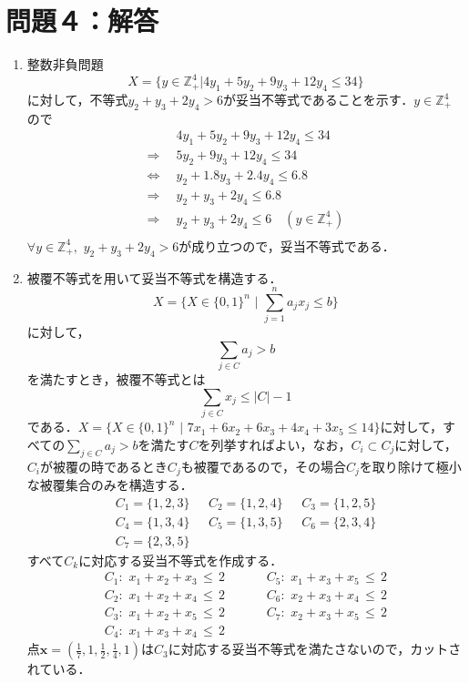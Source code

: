 \documentclass[a4paper,11pt]{jsarticle}
\numberwithin{theorem}{section}  %
\numberwithin{equation}{section} %
\begin{document}
\newpage
\section{問題４：解答}
\begin{enumerate}
\item
整数非負問題
\[
X=\{ y \in \mathbb{Z}_+^4 | 4y_1 + 5y_2 + 9y_3 + 12y_4 \le 34 \}
\]
に対して，不等式$y_2+y_3+2y_4 > 6$が妥当不等式であることを示す．$y \in \mathbb{Z}_+^4$ので
\[
\begin{split}
& \,\,\,4y_1 + 5y_2 + 9y_3 + 12y_4 \le 34 \\
\Rightarrow &\,\,\, 5y_2+9y_3 + 12y_4 \le 34\\
\Leftrightarrow &\,\,\, y_2 + 1.8y_3 + 2.4y_4 \le 6.8 \\
\Rightarrow &\,\,\, y_2 + y_3 + 2y_4 \le 6.8 \\
\Rightarrow &\,\,\, y_2 + y_3 + 2y_4 \le 6 \,\,\,\,\,\,(y\in \mathbb{Z}_+^4)\\
\end{split}
\]
$\forall y\in \mathbb{Z}_+^4,\,\, y_2+y_3+2y_4 > 6$が成り立つので，妥当不等式である．
\item
被覆不等式を用いて妥当不等式を構造する．\\
\[
X = \{ X \in \{0,1\}^n\,\,|\,\, \sum_{j=1}^n a_jx_j \le b \}
\]
に対して，
\[
\sum_{j \in C} a_j > b
\]
を満たすとき，被覆不等式とは
\[
\sum_{j\in C} x_j \le |C| -1
\]
である．$X = \{ X \in \{0,1\}^n\,\,|\,\, 7x_1 + 6x_2 + 6x_3 + 4x_4 + 3x_5 \le 14 \}$に対して，すべての$\sum_{j \in C} a_j > b$を満たす$C$を列挙すればよい，なお，$C_i \subset C_j$に対して，$C_i$が被覆の時であるとき$C_j$も被覆であるので，その場合$C_j$を取り除けて極小な被覆集合のみを構造する．
\begin{eqnarray*}
C_1 = \{ 1, 2, 3 \} \,\,&\,\, C_2 = \{ 1, 2, 4 \} \,\,&\,\, C_3 = \{ 1, 2, 5 \}  \\
C_4 = \{ 1, 3, 4 \} \,\,&\,\, C_5 = \{ 1, 3, 5 \} \,\,&\,\, C_6 = \{ 2, 3, 4 \}  \\
C_7 = \{ 2, 3, 5 \} \,\,&\,\, 
\end{eqnarray*}
すべて$C_k$に対応する妥当不等式を作成する．
\begin{eqnarray*}
C_1 : \,\, x_1 + x_2 + x_3 \,\le\, 2 \, &\,\,\,\,\,\,\,\,\,& C_5 : \,\, x_1 + x_3 + x_5 \,\le\, 2 \\
C_2 : \,\, x_1 + x_2 + x_4 \,\le\, 2 \, &\,\,\,\,\,\,\,\,\,& C_6 : \,\, x_2 + x_3 + x_4 \,\le\, 2 \\
C_3 : \,\, x_1 + x_2 + x_5 \,\le\, 2 \, &\,\,\,\,\,\,\,\,\,& C_7 : \,\, x_2 + x_3 + x_5 \,\le\, 2 \\ 
C_4 : \,\, x_1 + x_3 + x_4 \,\le\, 2 \, &\,\,\,&
\end{eqnarray*}
点$\bm{x}=(\frac{1}{7},1,\frac{1}{2},\frac{1}{4},1)$は$C_3$に対応する妥当不等式を満たさないので，カットされている．





\end{enumerate}
\end{document}

